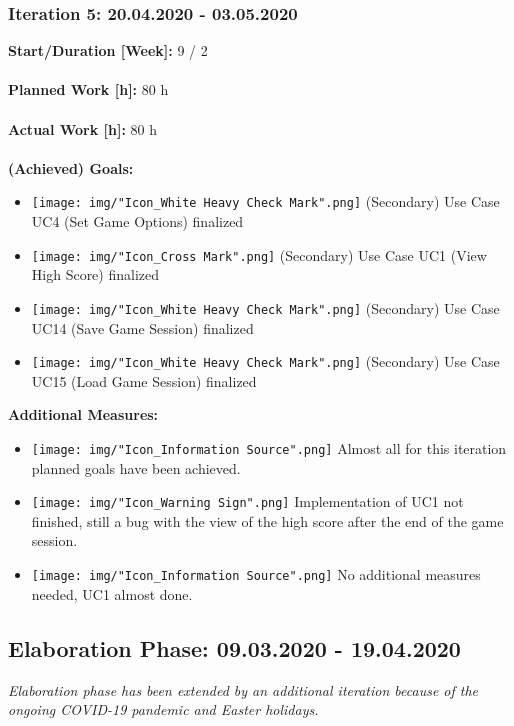 			\subsubsection{Iteration 5: 20.04.2020 - 03.05.2020}
				\textbf{Start/Duration [Week]:} 9 / 2 \\~\\
				\textbf{Planned Work [h]:} 80 h \\~\\
				\textbf{Actual Work [h]:} 80 h \\~\\
				\textbf{(Achieved) Goals:}
				\begin{itemize}
					\item \texttt{[image: img/"Icon\_White Heavy Check Mark".png]} (Secondary) Use Case UC4 (Set Game Options) finalized
					\item \texttt{[image: img/"Icon\_Cross Mark".png]} (Secondary) Use Case UC1 (View High Score) finalized
					\item \texttt{[image: img/"Icon\_White Heavy Check Mark".png]} (Secondary) Use Case UC14 (Save Game Session) finalized
					\item \texttt{[image: img/"Icon\_White Heavy Check Mark".png]} (Secondary) Use Case UC15 (Load Game Session) finalized
				\end{itemize}
				\textbf{Additional Measures:}
				\begin{itemize}
					\item \texttt{[image: img/"Icon\_Information Source".png]} Almost all for this iteration planned goals have been achieved.
					\item \texttt{[image: img/"Icon\_Warning Sign".png]} Implementation of UC1 not finished, still a bug with the view of the high score after the end of the game session.
					\item \texttt{[image: img/"Icon\_Information Source".png]} No additional measures needed, UC1 almost done.
				\end{itemize}

		\subsection{Elaboration Phase: 09.03.2020 - 19.04.2020}
		\textit{Elaboration phase has been extended by an additional iteration because of the ongoing COVID-19 pandemic and Easter holidays.}

